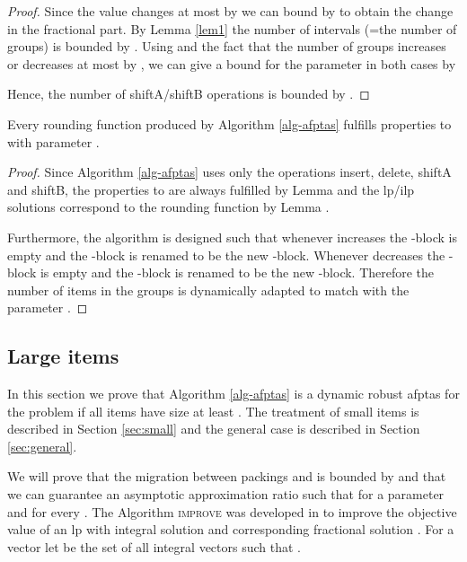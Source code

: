 \begin{proof}
Since the value  changes at most by  we can bound  by  to obtain the change in the fractional part. By  Lemma \ref{lem1} the number of intervals (=the number of groups) is bounded by . Using  and the fact that the number of groups  increases or decreases at most by , we can give a bound for the parameter  in both cases by

Hence, the number of shiftA/shiftB operations is bounded by .
\end{proof}


\begin{lemma}
\label{lem:binpackingalg}
    Every rounding function  produced by Algorithm \ref{alg-afptas} fulfills properties  to  with parameter .
\end{lemma}

\begin{proof}
Since Algorithm \ref{alg-afptas} uses only the operations insert, delete, shiftA and shiftB, the properties to are always fulfilled by Lemma  and the \ac{lp}/\ac{ilp} solutions  correspond to the rounding function by Lemma . 

Furthermore, the algorithm is designed such that whenever  increases the -block is empty and the -block is renamed to be the new -block. Whenever  decreases the -block is empty and the -block is renamed to be the new -block. Therefore the number of items in the groups is dynamically adapted to match with the parameter .
\end{proof}


\subsection{Large items}
In this section we prove that Algorithm \ref{alg-afptas} is a dynamic robust \ac{afptas} for the \BP problem if all items have size at least . The treatment of small items is described in Section \ref{sec:small} and the general case is described in Section \ref{sec:general}. 

We will prove that the migration between packings  and  is bounded by  and that we can guarantee an asymptotic approximation ratio such that  for a parameter  and for every .
The Algorithm \textsc{improve} was developed in \cite{jansen2013binpacking} to improve the objective value of an \ac{lp} with integral solution  and corresponding fractional solution . For a vector  let  be the set of all integral vectors  such that .

